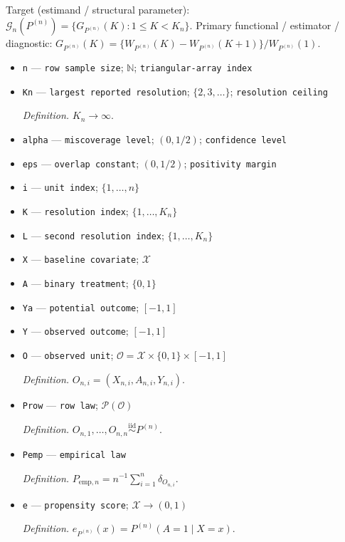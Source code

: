\documentclass{article}
\begin{document}
Target (estimand / structural parameter): \(\mathcal G_n(P^{(n)})=\{G_{P^{(n)}}(K):1\le K<K_n\}\).
Primary functional / estimator / diagnostic: \(G_{P^{(n)}}(K)=\{W_{P^{(n)}}(K)-W_{P^{(n)}}(K+1)\}/W_{P^{(n)}}(1)\).
\begin{itemize}
  \item \texttt{n} --- \texttt{row sample size}; \(\mathbb N\); \texttt{triangular-\allowbreak{}array index}
  \item \texttt{Kn} --- \texttt{largest reported resolution}; \(\{2,3,\ldots\}\); \texttt{resolution ceiling}
  \par\smallskip\noindent\emph{Definition.} \(K_n\to\infty\).
  \item \texttt{alpha} --- \texttt{miscoverage level}; \((0,1/2)\); \texttt{confidence level}
  \item \texttt{eps} --- \texttt{overlap constant}; \((0,1/2)\); \texttt{positivity margin}
  \item \texttt{i} --- \texttt{unit index}; \(\{1,\ldots,n\}\)
  \item \texttt{K} --- \texttt{resolution index}; \(\{1,\ldots,K_n\}\)
  \item \texttt{L} --- \texttt{second resolution index}; \(\{1,\ldots,K_n\}\)
  \item \texttt{X} --- \texttt{baseline covariate}; \(\mathcal X\)
  \item \texttt{A} --- \texttt{binary treatment}; \(\{0,1\}\)
  \item \texttt{Ya} --- \texttt{potential outcome}; \([-1,1]\)
  \item \texttt{Y} --- \texttt{observed outcome}; \([-1,1]\)
  \item \texttt{O} --- \texttt{observed unit}; \(\mathcal O=\mathcal X\times\{0,1\}\times[-1,1]\)
  \par\smallskip\noindent\emph{Definition.} \(O_{n,i}=(X_{n,i},A_{n,i},Y_{n,i})\).
  \item \texttt{Prow} --- \texttt{row law}; \(\mathcal P(\mathcal O)\)
  \par\smallskip\noindent\emph{Definition.} \(O_{n,1},\ldots,O_{n,n}\stackrel{\mathrm{iid}}{\sim}P^{(n)}\).
  \item \texttt{Pemp} --- \texttt{empirical law}
  \par\smallskip\noindent\emph{Definition.} \(P_{\mathrm{emp},n}=n^{-1}\sum_{i=1}^n\delta_{O_{n,i}}\).
  \item \texttt{e} --- \texttt{propensity score}; \(\mathcal X\to(0,1)\)
  \par\smallskip\noindent\emph{Definition.} \(e_{P^{(n)}}(x)=P^{(n)}(A=1\mid X=x)\).

\end{itemize}
\end{document}
